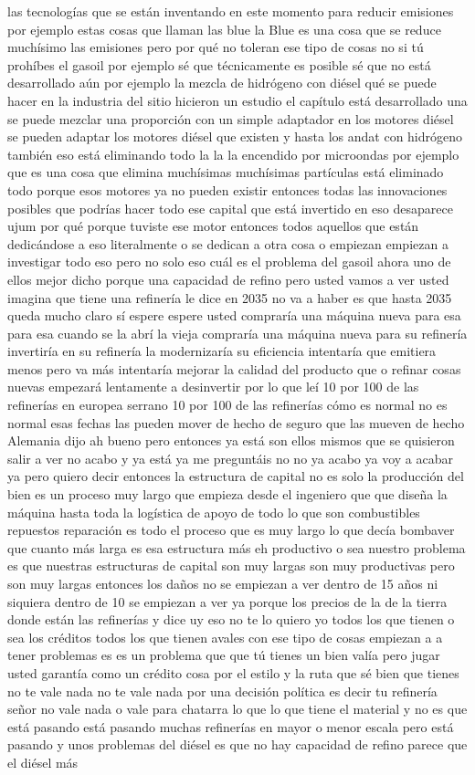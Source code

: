 las tecnologías que se están inventando en este momento para reducir emisiones por ejemplo estas cosas que llaman las blue la Blue es una cosa que se reduce muchísimo las emisiones pero por qué no toleran ese tipo de cosas no si tú prohíbes el gasoil por ejemplo sé que técnicamente es posible sé que no está desarrollado aún por ejemplo la mezcla de hidrógeno con diésel qué se puede hacer en la industria del sitio hicieron un estudio el capítulo está desarrollado una se puede mezclar una proporción con un simple adaptador en los motores diésel se pueden adaptar los motores diésel que existen y hasta los andat con hidrógeno también eso está eliminando todo la la la encendido por microondas por ejemplo que es una cosa que elimina muchísimas muchísimas partículas está eliminado todo porque esos motores ya no pueden existir entonces todas las innovaciones posibles que podrías hacer todo ese capital que está invertido en eso desaparece ujum por qué porque tuviste ese motor entonces todos aquellos que están dedicándose a eso literalmente o se dedican a otra cosa o empiezan empiezan a investigar todo eso pero no solo eso cuál es el problema del gasoil ahora uno de ellos mejor dicho porque una capacidad de refino pero usted vamos a ver usted imagina que tiene una refinería le dice en 2035 no va a haber es que hasta 2035 queda mucho claro sí espere espere usted compraría una máquina nueva para esa para esa cuando se la abrí la vieja compraría una máquina nueva para su refinería invertiría en su refinería la modernizaría su eficiencia intentaría que emitiera menos pero va más intentaría mejorar la calidad del producto que o refinar cosas nuevas empezará lentamente a desinvertir por lo que leí 10 por 100 de las refinerías en europea serrano 10 por 100 de las refinerías cómo es normal no es normal esas fechas las pueden mover de hecho de seguro que las mueven de hecho Alemania dijo ah bueno pero entonces ya está son ellos mismos que se quisieron salir a ver no acabo y ya está ya me preguntáis no no ya acabo ya voy a acabar ya pero quiero decir entonces la estructura de capital no es solo la producción del bien es un proceso muy largo que empieza desde el ingeniero que que diseña la máquina hasta toda la logística de apoyo de todo lo que son combustibles repuestos reparación es todo el proceso que es muy largo lo que decía bombaver que cuanto más larga es esa estructura más eh productivo o sea nuestro problema es que nuestras estructuras de capital son muy largas son muy productivas pero son muy largas entonces los daños no se empiezan a ver dentro de 15 años ni siquiera dentro de 10 se empiezan a ver ya porque los precios de la de la tierra donde están las refinerías y dice uy eso no te lo quiero yo todos los que tienen o sea los créditos todos los que tienen avales con ese tipo de cosas empiezan a a tener problemas es es un problema que que tú tienes un bien valía pero jugar usted garantía como un crédito cosa por el estilo y la ruta que sé bien que tienes no te vale nada no te vale nada por una decisión política es decir tu refinería señor no vale nada o vale para chatarra lo que lo que tiene el material y no es que está pasando está pasando muchas refinerías en mayor o menor escala pero está pasando y unos problemas del diésel es que no hay capacidad de refino parece que el diésel más 